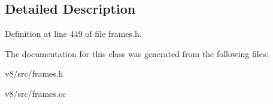 \subsection{Detailed Description}


Definition at line 449 of file frames.\+h.



The documentation for this class was generated from the following files\+:\begin{DoxyCompactItemize}
\item 
v8/src/frames.\+h\item 
v8/src/frames.\+cc\end{DoxyCompactItemize}
